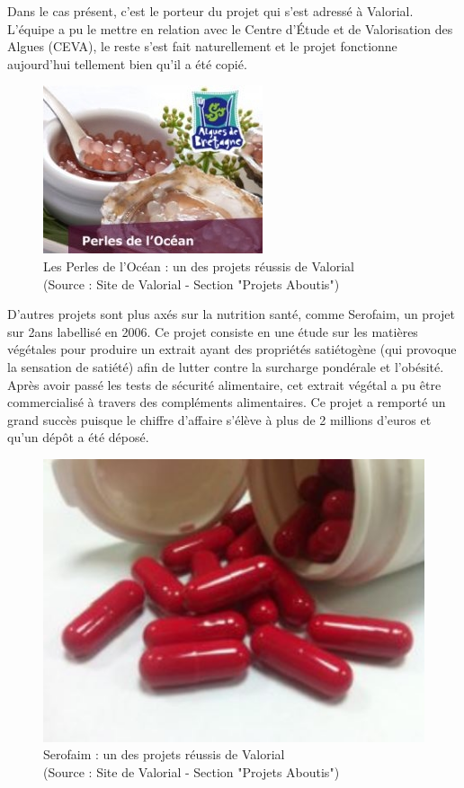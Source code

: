 \documentclass[a4paper,12pt]{report}
\begin{document}
	Dans le cas présent, c’est le porteur du projet qui s’est adressé à Valorial. L’équipe a pu le mettre en relation avec le Centre d’Étude et de Valorisation des Algues (CEVA), le reste s’est fait naturellement et le projet fonctionne aujourd’hui tellement bien qu’il a été copié.

\begin{figure}[!h]
			\centering
			\includegraphics[scale=0.5]{Illustrations/PerlesOcean.jpg}
			\caption{Les Perles de l'Océan : un des projets réussis de Valorial\\(Source : Site de Valorial - Section "Projets Aboutis"\cite{ProjetsAboutis})}
			\label{PerlesOcean}
			\end{figure}

				D’autres projets sont plus axés sur la nutrition santé, comme Serofaim, un projet sur 2ans labellisé en 2006. Ce projet consiste en une étude sur les matières végétales pour produire un extrait ayant des propriétés satiétogène (qui provoque la sensation de satiété) afin de lutter contre la surcharge pondérale et l’obésité. Après avoir passé les tests de sécurité alimentaire, cet extrait végétal a pu être commercialisé à travers des compléments alimentaires. Ce projet a remporté un grand succès puisque le chiffre d’affaire s’élève à plus de 2 millions d’euros et qu’un dépôt a été déposé.
				
		\begin{figure}[!h]
			\centering
			\includegraphics[scale=0.5]{Illustrations/Serofaim.jpg}
			\caption{Serofaim : un des projets réussis de Valorial\\(Source : Site de Valorial - Section "Projets Aboutis"\cite{ProjetsAboutis})}
			\label{Serofaim}
			\end{figure}		
\end{document}
